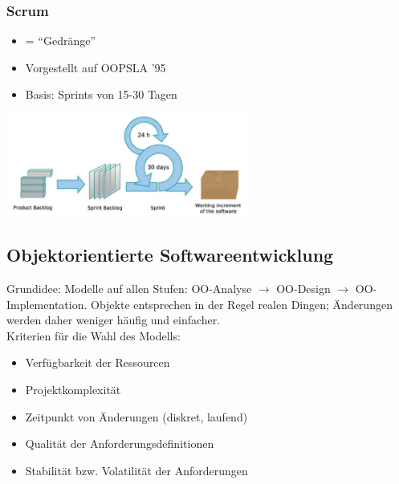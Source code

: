 \subsubsection{Scrum}
\begin{minipage}{11cm}
	\begin{itemize}
		\item = ``Gedränge''
		\item Vorgestellt auf OOPSLA '95
		\item Basis: Sprints von 15-30 Tagen
	\end{itemize}
\end{minipage}
\begin{minipage}{8cm}
	\includegraphics[width=8cm]{images/scrum.png}
\end{minipage}

\subsection{Objektorientierte Softwareentwicklung}
Grundidee: Modelle auf allen Stufen: OO-Analyse $\rightarrow$ OO-Design $\rightarrow$ OO-Implementation. Objekte entsprechen in der Regel realen Dingen; Änderungen werden daher weniger häufig und einfacher. \\

Kriterien für die Wahl des Modells:
\begin{itemize}
	\item Verfügbarkeit der Ressourcen
	\item Projektkomplexität
	\item Zeitpunkt von Änderungen (diskret, laufend)
	\item Qualität der Anforderungsdefinitionen
	\item Stabilität bzw. Volatilität der Anforderungen
\end{itemize}